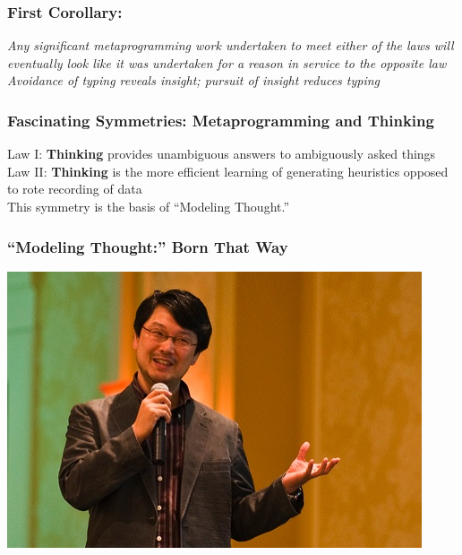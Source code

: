 \documentclass[slidestop,compress,mathserif]{beamer}
\begin{document}
\begin{frame}
	\frametitle{First Corollary:}
	\begin{center}
		\emph{Any significant metaprogramming work undertaken to meet either of
    the laws will eventually look like it was undertaken for a reason in
    service to the opposite law}
		\pause
		\vskip 0.5cm
		\emph{Avoidance of typing reveals insight; pursuit of insight reduces typing}
	\end{center}
\end{frame}

\begin{frame}
	\frametitle{Fascinating Symmetries:  Metaprogramming and Thinking}
	Law I:  \textbf{Thinking} provides unambiguous answers to ambiguously asked things \\
	Law II: \textbf{Thinking} is the more efficient learning of generating heuristics opposed to rote recording of data \\
	\vskip 0.5cm
	This symmetry is the basis of ``Modeling Thought.''
\end{frame}

\begin{frame}
	\frametitle{``Modeling Thought:'' Born That Way}
	\begin{center}
		\includegraphics[scale=0.6]{img/matz.jpg}		
	\end{center}
\end{frame}
\end{document}
